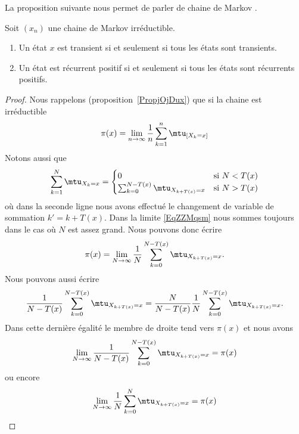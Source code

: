 La proposition suivante nous permet de parler de chaine de Markov .
\begin{proposition}     \label{PropUyLCzp}
	Soit \( (x_n)\) une chaine de Markov irréductible.
	\begin{enumerate}
		\item
		      Un état \( x\) est transient si et seulement si tous les états sont transients.
		\item
		      Un état est récurrent positif  si et seulement si tous les états sont récurrents positifs.
	\end{enumerate}
\end{proposition}

\begin{proof}
	Nous rappelons (proposition~\ref{PropjOjDux}) que si la chaine est irréductible
	\begin{equation}        \label{EqZZMqsm}
		\pi(x)=\lim_{n\to \infty} \frac{1}{ n }\sum_{k=1}^n\mtu_{[X_k=x]}
	\end{equation}
	Notons aussi que
	\begin{equation}
		\sum_{k=1}^N\mtu_{X_k=x}=\begin{cases}
			0                                      & \text{si } N<T(x) \\
			\sum_{k=0}^{N-T(x)}\mtu_{X_{k+T(x)}=x} & \text{si } N>T(x)
		\end{cases}
	\end{equation}
	où dans la seconde ligne nous avons effectué le changement de variable de sommation \( k'=k+T(x)\). Dans la limite \eqref{EqZZMqsm} nous sommes toujours dans le cas où \( N\) est assez grand. Nous pouvons donc écrire
	\begin{equation}
		\pi(x)=\lim_{N\to \infty} \frac{1}{ N }\sum_{k=0}^{N-T(x)}\mtu_{X_{k+T(x)}=x}.
	\end{equation}
	Nous pouvons aussi écrire
	\begin{equation}
		\frac{1}{ N-T(x) } \sum_{k=0}^{N-T(x)}\mtu_{X_{k+T(x)}=x}=\frac{ N }{ N-T(x) }\frac{1}{ N } \sum_{k=0}^{N-T(x)}\mtu_{X_{k+T(x)}=x}.
	\end{equation}
	Dans cette dernière égalité le membre de droite tend vers \( \pi(x)\) et nous avons
	\begin{equation}
		\lim_{N\to \infty} \frac{1}{ N-T(x) } \sum_{k=0}^{N-T(x)}\mtu_{X_{k+T(x)}=x}=\pi(x)
	\end{equation}
	ou encore
	\begin{equation}
		\lim_{N\to \infty} \frac{1}{ N} \sum_{k=0}^{N}\mtu_{X_{k+T(x)}=x}=\pi(x)

\end{equation}
\end{proof}

